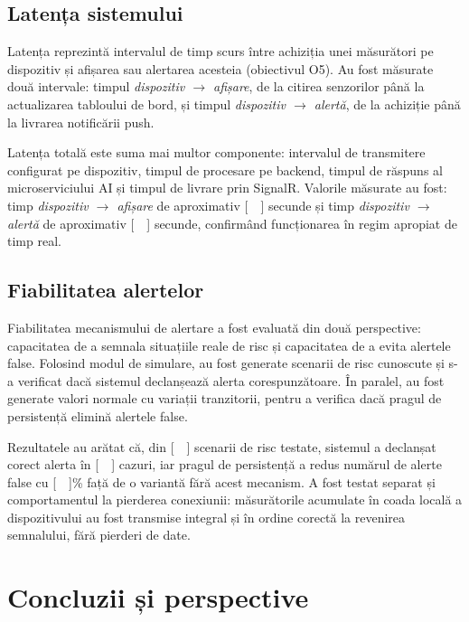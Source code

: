 \documentclass[12pt,a4paper]{article}
\begin{document}
\subsection{Latența sistemului}

Latența reprezintă intervalul de timp scurs între achiziția unei măsurători pe dispozitiv și afișarea sau alertarea acesteia (obiectivul O5). Au fost măsurate două intervale: timpul \textit{dispozitiv $\rightarrow$ afișare}, de la citirea senzorilor până la actualizarea tabloului de bord, și timpul \textit{dispozitiv $\rightarrow$ alertă}, de la achiziție până la livrarea notificării push.

Latența totală este suma mai multor componente: intervalul de transmitere configurat pe dispozitiv, timpul de procesare pe backend, timpul de răspuns al microserviciului AI și timpul de livrare prin SignalR. Valorile măsurate au fost: timp \textit{dispozitiv $\rightarrow$ afișare} de aproximativ [\ \ ] secunde și timp \textit{dispozitiv $\rightarrow$ alertă} de aproximativ [\ \ ] secunde, confirmând funcționarea în regim apropiat de timp real.

\subsection{Fiabilitatea alertelor}

Fiabilitatea mecanismului de alertare a fost evaluată din două perspective: capacitatea de a semnala situațiile reale de risc și capacitatea de a evita alertele false. Folosind modul de simulare, au fost generate scenarii de risc cunoscute și s-a verificat dacă sistemul declanșează alerta corespunzătoare. În paralel, au fost generate valori normale cu variații tranzitorii, pentru a verifica dacă pragul de persistență elimină alertele false.

Rezultatele au arătat că, din [\ \ ] scenarii de risc testate, sistemul a declanșat corect alerta în [\ \ ] cazuri, iar pragul de persistență a redus numărul de alerte false cu [\ \ ]\% față de o variantă fără acest mecanism. A fost testat separat și comportamentul la pierderea conexiunii: măsurătorile acumulate în coada locală a dispozitivului au fost transmise integral și în ordine corectă la revenirea semnalului, fără pierderi de date.

\newpage
\section{Concluzii și perspective}
\end{document}

